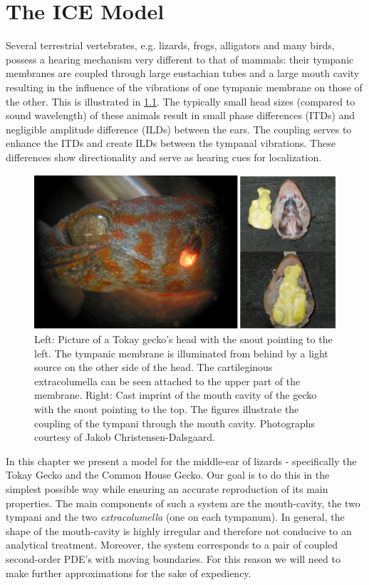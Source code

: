 \chapter{The ICE Model}
Several terrestrial vertebrates, e.g. lizards, frogs, alligators and many birds, possess a hearing mechanism very different to
that of mammals: their tympanic membranes are coupled through large eustachian tubes and a large mouth cavity resulting in the influence of the vibrations of one tympanic membrane
on those of the other. This is illustrated in \ref{geckohead}. The typically small head sizes (compared to sound wavelength) of these animals result in
small phase differences (ITDs) and negligible amplitude difference (ILDs) between the ears. The coupling serves to enhance the ITDs and create ILDs
between the tympanal vibrations. These differences show directionality and serve as hearing cues for localization.

\begin{figure}[ht!]
 \centering
 \includegraphics[width=.85\linewidth]{Diagrams/geckohead1.png}
 \caption[Illustration of a gecko's head]{Left: Picture of a Tokay gecko's head with the snout pointing to the left. The tympanic membrane is illuminated from behind by
 a light source on the other side of the head. The cartileginous extracolumella can be seen attached to the upper part of the membrane.
 Right: Cast imprint of the mouth cavity of the gecko with the snout pointing to the top. The figures illustrate the coupling of the tympani through the mouth cavity.
 Photographs courtesy of Jakob Christensen-Dalsgaard.}
  \label{geckohead}
\end{figure}

In this chapter we present a model for the
middle-ear of lizards - specifically the Tokay Gecko and the Common House Gecko. Our goal is to do this in the simplest possible way while ensuring an accurate reproduction of its main properties. 
The main components of such a 
system are the mouth-cavity, the two tympani and the two \textit{extracolumella} (one on each tympanum). In general, the shape of the mouth-cavity is highly irregular and therefore
not conducive to an analytical treatment. Moreover, the system corresponds to a pair of coupled second-order PDE's with
moving boundaries. For this reason we will need to make further approximations for the sake of expediency.

